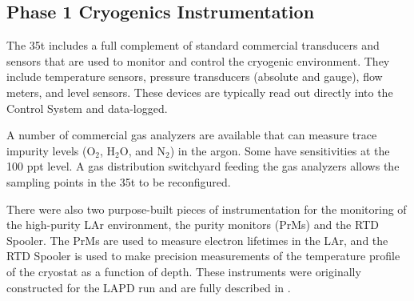 



\subsection {Phase 1 Cryogenics Instrumentation}

The 35t includes a full complement of standard commercial transducers and sensors that are used to 
monitor and control the cryogenic environment. They include temperature sensors, pressure transducers 
(absolute and gauge), flow meters, and level sensors. These devices are typically read out directly into the 
Control System and data-logged. 

A number of commercial gas analyzers are available  that can measure trace impurity levels (O$_2$, H$_2$O, and 
N$_2$) in the argon. Some have sensitivities at the 100 ppt level. A gas distribution switchyard feeding the 
gas analyzers allows the sampling points in the 35t to be reconfigured.

There were also two purpose-built pieces of instrumentation for the monitoring of the high-purity 
LAr environment,   %
the purity monitors (PrMs) and the RTD Spooler. The 
PrMs are used to measure electron lifetimes in the LAr, and the RTD Spooler is used to make precision 
measurements of the temperature profile of the cryostat as a function of depth.  These instruments were 
originally constructed for the LAPD run and are fully described %
in \cite{bib:lapdP07005}.

